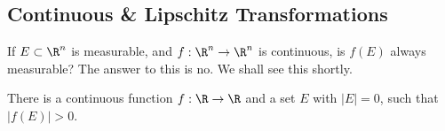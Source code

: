 













\subsection{Continuous \& Lipschitz Transformations}

If $E \subset \R^n$ is measurable, and $f: \R^n \to \R^n$ is continuous, is $f(E)$ always measurable? The answer to this is no. We shall see this shortly. 


\begin{lem} \label{lem:rcontfun}
There is a continuous function $f: \R \to \R$ and a set $E$ with $|E|=0$, such that $|f(E)|>0$.
\end{lem}

\pfsk 





